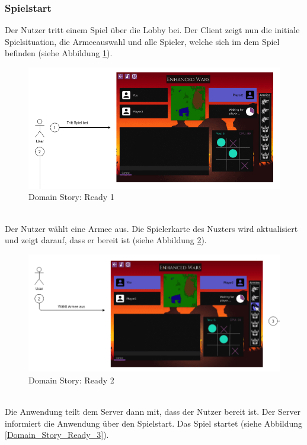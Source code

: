 \documentclass[12pt, titlepage]{scrartcl}
\begin{document}
		    \subsubsection{Spielstart}
		    	Der Nutzer tritt einem Spiel \"uber die Lobby bei. Der Client zeigt nun die initiale Spielsituation, die Armeeauswahl und alle Spieler, welche sich im dem Spiel befinden (siehe Abbildung \ref{Domain_Story_Ready_1}).
			    \begin{figure}[H] 
			    	\centering
			    	\includegraphics[width=\textwidth]{images/domain_stories/readyStory1.png}
			    	\caption{Domain Story: Ready 1}
			    	\label{Domain_Story_Ready_1}
			    \end{figure}
				\ \\ Der Nutzer w\"ahlt eine Armee aus. Die Spielerkarte des Nuzters wird aktualisiert und zeigt darauf, dass er bereit ist (siehe Abbildung \ref{Domain_Story_Ready_2}).
			    \begin{figure}[H] 
			    	\centering
			    	\includegraphics[width=\textwidth]{images/domain_stories/readyStory2.png}
			    	\caption{Domain Story: Ready 2}
			    	\label{Domain_Story_Ready_2}
			    \end{figure}
				\ \\ Die Anwendung teilt dem Server dann mit, dass der Nutzer bereit ist. Der Server informiert die Anwendung \"uber den Spielstart. Das Spiel startet (siehe Abbildung \ref{Domain_Story_Ready_3}).
\end{document}
